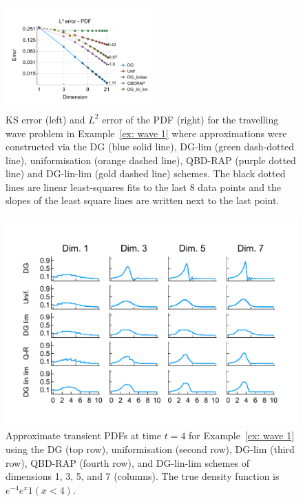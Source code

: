 \begin{example}
\begin{figure}[h]
		\includegraphics[width=0.5\textwidth,trim={0.75cm 0.8cm 0.25cm 1.25cm},clip]{chapter6/figs/wave/fun1/meshs_l2_pdf_error_formatted.pdf}
		\caption{KS error (left) and \(L^2\) error of the PDF (right) for the travelling wave problem in Example~\ref{ex: wave 1} where approximations were constructed via the DG (blue solid line), DG-lim (green dash-dotted line), uniformisation (orange dashed line), QBD-RAP (purple dotted line) and DG-lin-lim (gold dashed line) schemes. The black dotted lines are linear least-squares fits to the last 8 data points and the slopes of the least square lines are written next to the last point.} 
		\label{fig: fun 1 wave} 
	\end{figure}
	\begin{figure}[h]
		\centering
		\includegraphics[width=\textwidth,trim={0cm 1.25cm 0cm 1.25cm},clip]{chapter6/figs/wave/fun1/pdf_formatted.pdf}
		\caption{Approximate transient PDFs at time \(t=4\) for Example~\ref{ex: wave 1} using the DG (top row), uniformisation (second row), DG-lim (third row), QBD-RAP (fourth row), and DG-lin-lim schemes of dimensions 1, 3, 5, and 7 (columns). The true density function is \(e^{-4}e^{x}1(x<4)\).} 
		\label{fig: pdf wave fun 1}
	\end{figure} 
	\exampleFloatBarrier
\end{example} 

